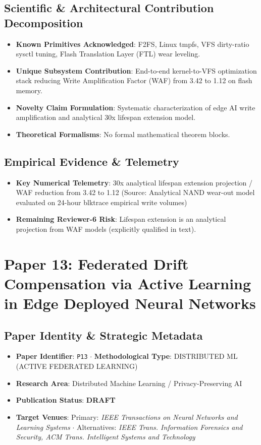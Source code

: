 \documentclass[11pt,a4paper]{article}
\begin{document}
\subsection*{Scientific & Architectural Contribution Decomposition}
\begin{itemize}[leftmargin=1.5em, itemsep=0.2em]
    \item \textbf{Known Primitives Acknowledged}: F2FS, Linux tmpfs, VFS dirty-ratio sysctl tuning, Flash Translation Layer (FTL) wear leveling.
    \item \textbf{Unique Subsystem Contribution}: End-to-end kernel-to-VFS optimization stack reducing Write Amplification Factor (WAF) from 3.42 to 1.12 on flash memory.
    \item \textbf{Novelty Claim Formulation}: Systematic characterization of edge AI write amplification and analytical 30x lifespan extension model.
    \item \textbf{Theoretical Formalisms}: No formal mathematical theorem blocks.
\end{itemize}

\subsection*{Empirical Evidence & Telemetry}
\begin{itemize}[leftmargin=1.5em, itemsep=0.2em]
    \item \textbf{Key Numerical Telemetry}: 30x analytical lifespan extension projection / WAF reduction from 3.42 to 1.12 (Source: Analytical NAND wear-out model evaluated on 24-hour blktrace empirical write volumes)
    \item \textbf{Remaining Reviewer-6 Risk}: Lifespan extension is an analytical projection from WAF models (explicitly qualified in text).
\end{itemize}

\section{Paper 13: Federated Drift Compensation via Active Learning in Edge Deployed Neural Networks}

\subsection*{Paper Identity \& Strategic Metadata}
\begin{itemize}[leftmargin=1.5em, itemsep=0.2em]
    \item \textbf{Paper Identifier}: \texttt{P13} $\cdot$ \textbf{Methodological Type}: DISTRIBUTED ML (ACTIVE FEDERATED LEARNING)
    \item \textbf{Research Area}: Distributed Machine Learning / Privacy-Preserving AI
    \item \textbf{Publication Status}: \textbf{DRAFT}
    \item \textbf{Target Venues}: Primary: \textit{IEEE Transactions on Neural Networks and Learning Systems} $\cdot$ Alternatives: \textit{IEEE Trans. Information Forensics and Security, ACM Trans. Intelligent Systems and Technology}
\end{itemize}
\end{document}
